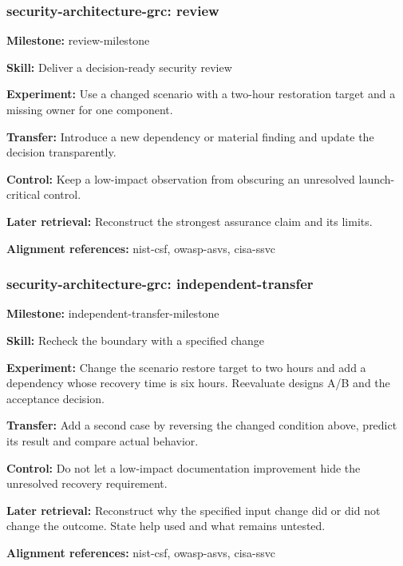 \subsubsection{security-architecture-grc: review}
\noindent\textbf{Milestone:} review-milestone\par
\noindent\textbf{Skill:} Deliver a decision-ready security review\par
\noindent\textbf{Experiment:} Use a changed scenario with a two-hour restoration target and a missing owner for one component.\par
\noindent\textbf{Transfer:} Introduce a new dependency or material finding and update the decision transparently.\par
\noindent\textbf{Control:} Keep a low-impact observation from obscuring an unresolved launch-critical control.\par
\noindent\textbf{Later retrieval:} Reconstruct the strongest assurance claim and its limits.\par
\noindent\textbf{Alignment references:} nist-csf, owasp-asvs, cisa-ssvc\par
\subsubsection{security-architecture-grc: independent-transfer}
\noindent\textbf{Milestone:} independent-transfer-milestone\par
\noindent\textbf{Skill:} Recheck the boundary with a specified change\par
\noindent\textbf{Experiment:} Change the scenario restore target to two hours and add a dependency whose recovery time is six hours. Reevaluate designs A/B and the acceptance decision.\par
\noindent\textbf{Transfer:} Add a second case by reversing the changed condition above, predict its result and compare actual behavior.\par
\noindent\textbf{Control:} Do not let a low-impact documentation improvement hide the unresolved recovery requirement.\par
\noindent\textbf{Later retrieval:} Reconstruct why the specified input change did or did not change the outcome. State help used and what remains untested.\par
\noindent\textbf{Alignment references:} nist-csf, owasp-asvs, cisa-ssvc\par
